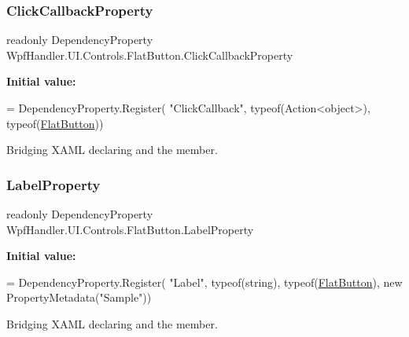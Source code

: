 \subsubsection{\texorpdfstring{Click\+Callback\+Property}{ClickCallbackProperty}}
{\footnotesize\ttfamily readonly Dependency\+Property Wpf\+Handler.\+U\+I.\+Controls.\+Flat\+Button.\+Click\+Callback\+Property\hspace{0.3cm}{\ttfamily [static]}}

{\bfseries Initial value\+:}
\begin{DoxyCode}
= DependencyProperty.Register(
          \textcolor{stringliteral}{"ClickCallback"}, typeof(Action<object>), typeof(\mbox{\hyperlink{class_wpf_handler_1_1_u_i_1_1_controls_1_1_flat_button_a17b78f2f94dad89be055e7bd3eec09da}{FlatButton}}))
\end{DoxyCode}


Bridging X\+A\+ML declaring and the member. 

\mbox{\label{class_wpf_handler_1_1_u_i_1_1_controls_1_1_flat_button_acad3d234805ceee99eeced499fe8cd80}} 
\subsubsection{\texorpdfstring{Label\+Property}{LabelProperty}}
{\footnotesize\ttfamily readonly Dependency\+Property Wpf\+Handler.\+U\+I.\+Controls.\+Flat\+Button.\+Label\+Property\hspace{0.3cm}{\ttfamily [static]}}

{\bfseries Initial value\+:}
\begin{DoxyCode}
= DependencyProperty.Register(
          \textcolor{stringliteral}{"Label"}, typeof(\textcolor{keywordtype}{string}), typeof(\mbox{\hyperlink{class_wpf_handler_1_1_u_i_1_1_controls_1_1_flat_button_a17b78f2f94dad89be055e7bd3eec09da}{FlatButton}}), \textcolor{keyword}{new} PropertyMetadata(\textcolor{stringliteral}{"Sample"}))
\end{DoxyCode}


Bridging X\+A\+ML declaring and the member. 



